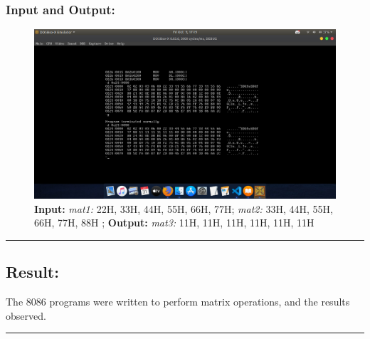 \documentclass[10pt,a4paper]{article}
\begin{document}
\begin{flushleft}
\subsubsection*{\textbf{Input and Output:}}
\begin{figure}[h]
    \centering
    \includegraphics[trim = 100mm 60mm 100mm 80mm, clip, width = \textwidth]{Pics/MSIO.png}
    \caption{ \textbf{Input:} \emph{mat1:} 22H, 33H, 44H, 55H, 66H, 77H; \emph{mat2:} 33H, 44H, 55H, 66H, 77H, 88H ; \newline \hspace{1cm}
              \textbf{Output:} \emph{mat3:} 11H, 11H, 11H, 11H, 11H, 11H}
\end{figure}
\hrule
\subsection*{\textbf{Result:}}
The 8086 programs were written to perform matrix operations, and the results observed.
\end{flushleft}
\hrule
\newpage
\end{document}
